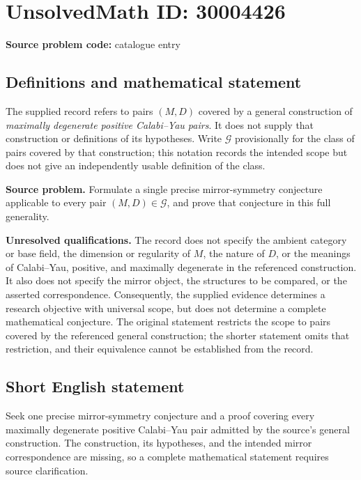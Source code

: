 \documentclass[11pt]{article}
\begin{document}
\section*{UnsolvedMath ID: 30004426}
\textbf{Source problem code:} catalogue entry
\subsection{Definitions and mathematical statement}
The supplied record refers to pairs \((M,D)\) covered by a general construction of \emph{maximally degenerate positive Calabi--Yau pairs}. It does not supply that construction or definitions of its hypotheses. Write \(\mathcal G\) provisionally for the class of pairs covered by that construction; this notation records the intended scope but does not give an independently usable definition of the class.

\textbf{Source problem.} Formulate a single precise mirror-symmetry conjecture applicable to every pair \((M,D)\in\mathcal G\), and prove that conjecture in this full generality.

\textbf{Unresolved qualifications.} The record does not specify the ambient category or base field, the dimension or regularity of \(M\), the nature of \(D\), or the meanings of Calabi--Yau, positive, and maximally degenerate in the referenced construction. It also does not specify the mirror object, the structures to be compared, or the asserted correspondence. Consequently, the supplied evidence determines a research objective with universal scope, but does not determine a complete mathematical conjecture. The original statement restricts the scope to pairs covered by the referenced general construction; the shorter statement omits that restriction, and their equivalence cannot be established from the record.
\subsection{Short English statement}
Seek one precise mirror-symmetry conjecture and a proof covering every maximally degenerate positive Calabi--Yau pair admitted by the source's general construction. The construction, its hypotheses, and the intended mirror correspondence are missing, so a complete mathematical statement requires source clarification.
\end{document}
